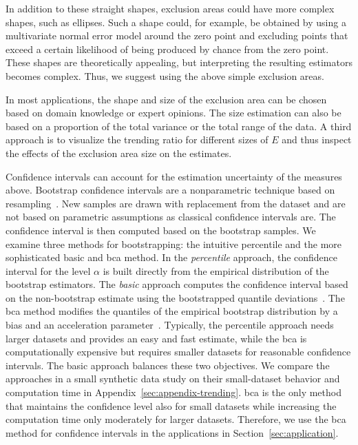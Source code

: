In addition to these straight shapes, exclusion areas could have more complex shapes, such as ellipses.
Such a shape could, for example, be obtained by using a multivariate normal error model around the zero point and excluding points that exceed a certain likelihood of being produced by chance from the zero point.
These shapes are theoretically appealing, but interpreting the resulting estimators becomes complex.
Thus, we suggest using the above simple exclusion areas.

In most applications, the shape and size of the exclusion area can be chosen based on domain knowledge or expert opinions.
The size estimation can also be based on a proportion of the total variance or the total range of the data.
A third approach is to visualize the trending ratio for different sizes of $E$ and thus inspect the effects of the exclusion area size on the estimates.

Confidence intervals can account for the estimation uncertainty of the measures above.
Bootstrap confidence intervals are a nonparametric technique based on resampling~\parencite[for introductions see][]{Hesterberg2011,Bittmann2021}.
New samples are drawn with replacement from the dataset and are not based on parametric assumptions as classical confidence intervals are.
The confidence interval is then computed based on the bootstrap samples.
We examine three methods for bootstrapping: the intuitive percentile and the more sophisticated basic and \ac{bca} method.
In the \textit{percentile} approach, the confidence interval for the level $\alpha$ is built directly from the empirical distribution of the bootstrap estimators.
The \textit{basic} approach computes the confidence interval based on the non-bootstrap estimate using the bootstrapped quantile deviations~\parencite{Davison1997}.
The \ac{bca} method modifies the quantiles of the empirical bootstrap distribution by a bias and an acceleration parameter~\parencite{Efron1987}.
Typically, the percentile approach needs larger datasets and provides an easy and fast estimate, while the \ac{bca} is computationally expensive but requires smaller datasets for reasonable confidence intervals.
The basic approach balances these two objectives.
We compare the approaches in a small synthetic data study on their small-dataset behavior and computation time in Appendix~\ref{sec:appendix-trending}.
\Ac{bca} is the only method that maintains the confidence level also for small datasets while increasing the computation time only moderately for larger datasets.
Therefore, we use the \ac{bca} method for confidence intervals in the applications in Section~\ref{sec:application}.

